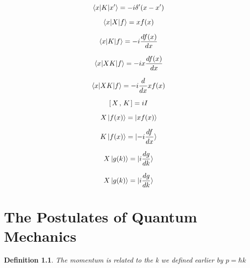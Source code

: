 \documentclass{tufte-book}
\newtheorem{definition}{Definition}
\newcommand{\commutator}[3][1.2em]{[ \makebox[#1]{$#2$} , \makebox[#1]{$#3$} ]}
\begin{document}
\begin{equation}
	\label{eq:19}
	\braket{x|K|x'} = -i\delta'(x-x')
\end{equation}

\begin{equation}
	\label{eq:20}
	\braket{x|X|f} = xf(x)
\end{equation}

\begin{equation}
	\label{eq:21}
	\braket{x|K|f} = -i\frac{df(x)}{dx}
\end{equation}

\begin{equation}
	\label{eq:22}
	\braket{x|XK|f} = -ix\frac{df(x)}{dx}
\end{equation}

\begin{equation}
	\label{eq:23}
	\braket{x|XK|f} = -i\frac{d}{dx}xf(x)
\end{equation}

\begin{equation}
	\label{eq:24}
	\commutator{X}{K} = iI
\end{equation}

\begin{equation}
	\label{eq:25}
	X\ket{f(x)} = \ket{xf(x)}
\end{equation}

\begin{equation}
	\label{eq:26}
	K\ket{f(x)} = \ket{-i\frac{df}{dx}}
\end{equation}

\begin{equation}
	\label{eq:27}
	X\ket{g(k)} = \ket{i\frac{dg}{dk}}
\end{equation}

\begin{equation}
	\label{eq:28}
	X\ket{g(k)} = \ket{i\frac{dg}{dk}}
\end{equation}

\chapter{The Postulates of Quantum Mechanics}
\begin{definition}
	\label{def:16}
	The momentum is related to the k we defined earlier by $p = \hbar k$
\end{definition}
\end{document}
